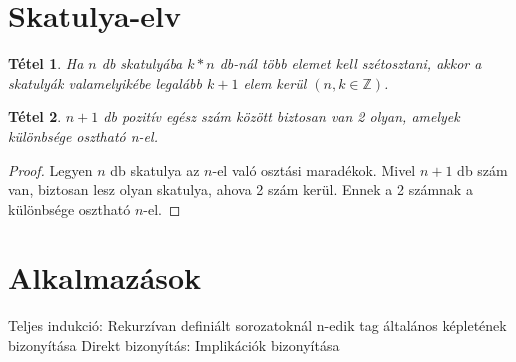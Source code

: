 \documentclass[twoside,12pt]{report}
\newtheorem{theorem}{Tétel}[section]
\theoremstyle{definition}
\begin{document}
\section{Skatulya-elv}
	\begin{theorem}
		Ha $n$ db skatulyába $k*n$ db-nál több elemet kell szétosztani, akkor a skatulyák valamelyikébe legalább $k+1$ elem kerül $(n,k\in\mathbb{Z})$.
	\end{theorem}
	\begin{theorem}
		$n+1$ db pozitív egész szám között biztosan van 2 olyan, amelyek különbsége osztható n-el.
	\end{theorem}
	\begin{proof}
		Legyen $n$ db skatulya az $n$-el való osztási maradékok. Mivel $n+1$ db szám van, biztosan lesz olyan skatulya, ahova 2 szám kerül. Ennek a 2 számnak a különbsége osztható $n$-el.
	\end{proof}
\section{Alkalmazások}
	\begin{outline}
		\1 Teljes indukció:
			\2 Rekurzívan definiált sorozatoknál n-edik tag általános képletének bizonyítása
		\1 Direkt bizonyítás:
			\2 Implikációk bizonyítása
	\end{outline}
\end{document}

